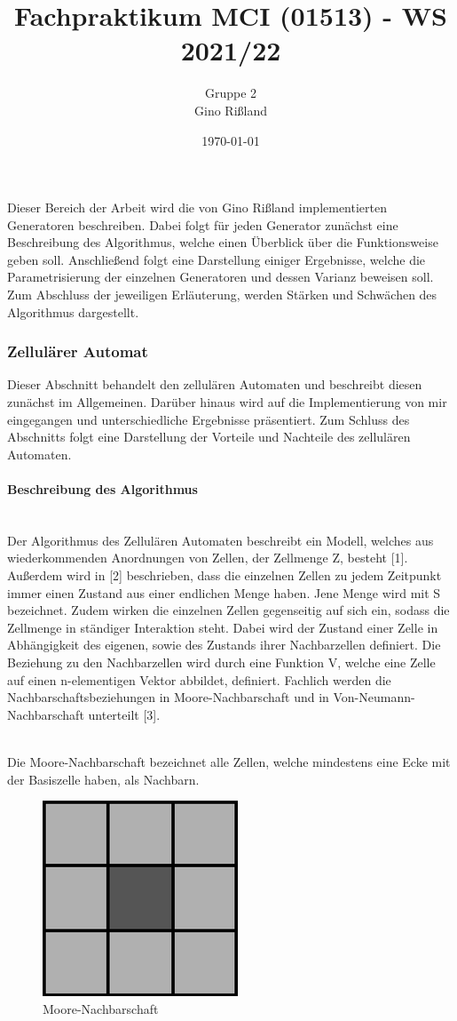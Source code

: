 \documentclass[../mciAusarbeitung.tex]{subfiles}
\title{Fachpraktikum MCI (01513) - WS 2021/22}
\author{Gruppe 2\\
	Gino Rißland}
\date{\today}
\begin{document}
	
	
	Dieser Bereich der Arbeit wird die von Gino Rißland implementierten Generatoren beschreiben. Dabei folgt für jeden Generator zunächst eine Beschreibung des Algorithmus, welche einen Überblick über die Funktionsweise geben soll. Anschließend folgt eine Darstellung einiger Ergebnisse, welche die Parametrisierung der einzelnen Generatoren und dessen Varianz beweisen soll. Zum Abschluss der jeweiligen Erläuterung, werden Stärken und Schwächen des Algorithmus dargestellt.
		    \subsubsection{Zellulärer Automat}
		    Dieser Abschnitt behandelt den zellulären Automaten und beschreibt diesen zunächst im Allgemeinen. Darüber hinaus wird auf die Implementierung von mir eingegangen und unterschiedliche Ergebnisse präsentiert. Zum Schluss des Abschnitts folgt eine Darstellung der Vorteile und Nachteile des zellulären Automaten.
		    \paragraph{Beschreibung des Algorithmus}$~$ \\
		    Der Algorithmus des Zellulären Automaten beschreibt ein Modell, welches aus wiederkommenden Anordnungen von Zellen, der Zellmenge Z, besteht [1]. Außerdem wird in [2] beschrieben, dass die einzelnen Zellen zu jedem Zeitpunkt immer einen Zustand aus einer endlichen Menge haben. Jene Menge wird mit S bezeichnet. Zudem wirken die einzelnen Zellen gegenseitig auf sich ein, sodass die Zellmenge in ständiger Interaktion steht. Dabei wird der Zustand einer Zelle in Abhängigkeit des eigenen, sowie des Zustands ihrer Nachbarzellen definiert.  Die Beziehung zu den Nachbarzellen wird durch eine Funktion 
            V, welche eine Zelle auf einen n-elementigen Vektor abbildet, definiert. Fachlich werden die Nachbarschaftsbeziehungen in Moore-Nachbarschaft und in Von-Neumann-Nachbarschaft unterteilt [3].
            
            $~$ \\Die Moore-Nachbarschaft bezeichnet alle Zellen, welche mindestens eine Ecke mit der Basiszelle haben, als Nachbarn.\\
            

\begin{figure}[H]
\centering
            \includegraphics[width=0.5\linewidth]{"1..png"}

\caption{Moore-Nachbarschaft}
\end{figure}  
  
\end{document}
